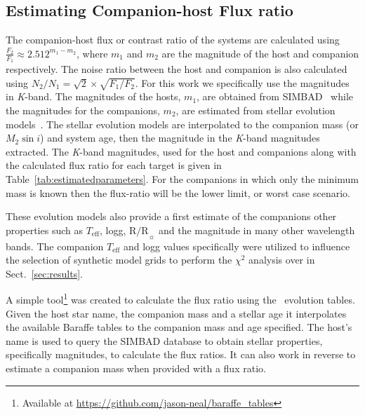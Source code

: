 \documentclass[fleqn,usenatbib]{mnras}
\begin{document}
    \subsection{Estimating Companion-host Flux ratio}
    \label{compaion flux ration}
    The companion-host flux or contrast ratio of the systems are calculated using \( \frac{F_{2}}{F_{1}} \approx 2.512^{m_{1}-m_{2}}\), where \(m_{1}\) and \(m_{2}\) are the magnitude of the host and companion respectively. The noise ratio between the host and companion is also calculated using \(N_{2}/N_{1} = \sqrt{2} \times\sqrt{F_{1}/F_{2}}\).  For this work we specifically use the magnitudes in \textit{K}-band. The magnitudes of the hosts, \(m_{1}\), are obtained from SIMBAD~\citep{wenger_simbad_2000} while the magnitudes for the companions, \(m_{2}\), are estimated from stellar evolution models~\citet{baraffe_evolutionary_2003, baraffe_new_2015}. The stellar evolution models are interpolated to the companion mass  (or \(M_{2}\sin{i}\)) and system age, then the magnitude in the \textit{K}-band magnitudes extracted. The \textit{K}-band magnitudes, used for the host and companions along with the calculated flux ratio for each target is given in Table~\ref{tab:estimatedparameters}. For the companions in which only the minimum mass is known then the flux-ratio will be the lower limit, or worst case scenario.

    These evolution models also provide a first estimate of the companions other properties such as \(T_{\textrm{eff}}\), logg, \(\textrm{R/R}_{\sun}\) and the magnitude in many other wavelength bands.  The companion \(T_{\textrm{eff}}\) and logg values specifically were utilized to influence the selection of synthetic model grids to perform the \(\chi^2\) analysis over in Sect.~\ref{sec:results}.

    A simple tool\footnote{Available at \url{https://github.com/jason-neal/baraffe_tables}} was created to calculate the flux ratio using the~\citep{baraffe_evolutionary_2003,baraffe_new_2015} evolution tables. Given the host star name, the companion mass and a stellar age it interpolates the available Baraffe tables to the companion mass and age specified. The host's name is used to query the {SIMBAD} database to obtain stellar properties, specifically magnitudes, to calculate the flux ratios. It can also work in reverse to estimate a companion mass when provided with a flux ratio.

\bsp{}	%
\label{lastpage}
\end{document}
